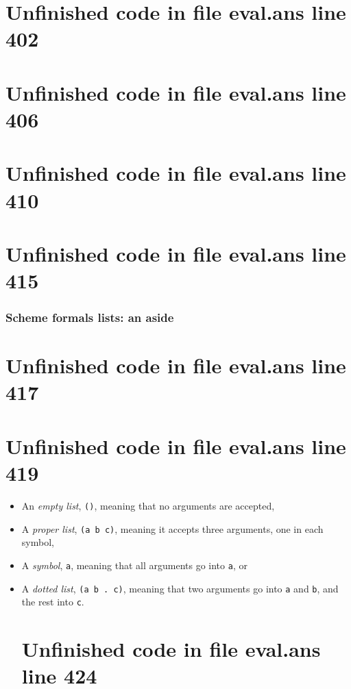 \documentclass[twoside,9pt]{report}
\begin{document}
\section{Unfinished code in file eval.ans line 402}
\section{Unfinished code in file eval.ans line 406}
\section{Unfinished code in file eval.ans line 410}
\section{Unfinished code in file eval.ans line 415}
\subsubsection{Scheme formals lists: an aside}
\label{scheme-formals-lists-an-aside}
\section{Unfinished code in file eval.ans line 417}
\section{Unfinished code in file eval.ans line 419}
\begin{itemize}
\item  An \emph{empty list}, \texttt{()}, meaning that no arguments are accepted,
\item  A \emph{proper list}, \texttt{(a b c)}, meaning it accepts three arguments, one in each symbol,
\item  A \emph{symbol}, \texttt{a}, meaning that all arguments go into \texttt{a}, or
\item  A \emph{dotted list}, \texttt{(a b . c)}, meaning that two arguments go into \texttt{a} and \texttt{b}, and the rest into \texttt{c}.
\section{Unfinished code in file eval.ans line 424}
\end{itemize}
\end{document}
